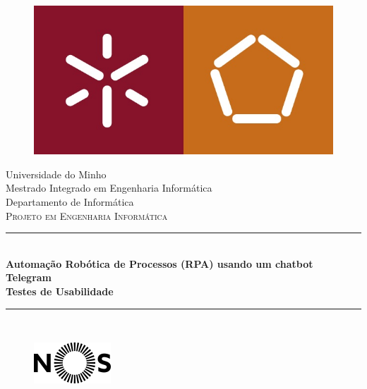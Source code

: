 \documentclass[11pt, a4paper]{article}
\begin{document}
\setcounter{tocdepth}{4}
\setcounter{secnumdepth}{4}
\begin{titlepage}

\newcommand{\HRule}{\rule{\linewidth}{0.5mm}} %

\center %

\begin{figure}[H]
    \centering
    \includegraphics[scale=0.5]{images/UM_EENG.jpg}
    \label{figUM}
\end{figure}

\large Universidade do Minho\\[0.2cm] %
\large Mestrado Integrado em Engenharia Informática\\[0.2cm] %
\large Departamento de Informática\\[2.5cm] %

\textsc{\Large Projeto em Engenharia Informática}\\[0.3cm] %
\HRule \\[0.3cm]
{ \LARGE \bfseries Automação Robótica de Processos (RPA) usando um chatbot Telegram}\\[0.4cm] %
{ \LARGE \bfseries Testes de Usabilidade}\\[0.3cm]
\HRule \\[0.3cm]

\begin{figure}[H]
    \centering
    \includegraphics[scale=0.6]{images/nos.png}
    \label{figNOS}
\end{figure}


\end{titlepage}
\end{document}
